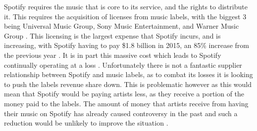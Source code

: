 \par 
Spotify requires the music that is core to its service, and the rights to distribute it. This requires the acquisition of licenses from music labels, with the biggest 3 being Universal Music Group, Sony Music Entertainment, and Warner Music Group \parencite{spotify_lapsed_music_labels}. This licensing is the largest expense that Spotify incurs, and is increasing, with Spotify having to pay \$1.8 billion in 2015, an 85\% increase from the previous year \parencite{broken_music_industry}. It is in part this massive cost which leads to Spotify continually operating at a loss \parencite{spotify_losses}. Unfortunately there is not a fantastic supplier relationship between Spotify and music labels, as to combat its losses it is looking to push the labels revenue share down. This is problematic however as this would mean that Spotify would be paying artists less, as they receive a portion of the money paid to the labels. The amount of money that artists receive from having their music on Spotify has already caused controversy in the past and such a reduction would be unlikely to improve the situation \parencite{guardian_swift, spotify_lapsed_music_labels}.